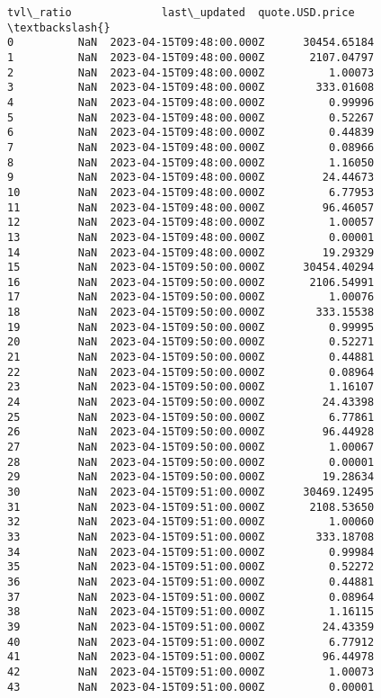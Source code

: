 \documentclass[11pt]{article}
\begin{document}
\begin{tcolorbox}[breakable, size=fbox, boxrule=.5pt, pad at break*=1mm, opacityfill=0]
\begin{Verbatim}[commandchars=\\\{\}]
     tvl\_ratio              last\_updated  quote.USD.price  \textbackslash{}
0          NaN  2023-04-15T09:48:00.000Z      30454.65184
1          NaN  2023-04-15T09:48:00.000Z       2107.04797
2          NaN  2023-04-15T09:48:00.000Z          1.00073
3          NaN  2023-04-15T09:48:00.000Z        333.01608
4          NaN  2023-04-15T09:48:00.000Z          0.99996
5          NaN  2023-04-15T09:48:00.000Z          0.52267
6          NaN  2023-04-15T09:48:00.000Z          0.44839
7          NaN  2023-04-15T09:48:00.000Z          0.08966
8          NaN  2023-04-15T09:48:00.000Z          1.16050
9          NaN  2023-04-15T09:48:00.000Z         24.44673
10         NaN  2023-04-15T09:48:00.000Z          6.77953
11         NaN  2023-04-15T09:48:00.000Z         96.46057
12         NaN  2023-04-15T09:48:00.000Z          1.00057
13         NaN  2023-04-15T09:48:00.000Z          0.00001
14         NaN  2023-04-15T09:48:00.000Z         19.29329
15         NaN  2023-04-15T09:50:00.000Z      30454.40294
16         NaN  2023-04-15T09:50:00.000Z       2106.54991
17         NaN  2023-04-15T09:50:00.000Z          1.00076
18         NaN  2023-04-15T09:50:00.000Z        333.15538
19         NaN  2023-04-15T09:50:00.000Z          0.99995
20         NaN  2023-04-15T09:50:00.000Z          0.52271
21         NaN  2023-04-15T09:50:00.000Z          0.44881
22         NaN  2023-04-15T09:50:00.000Z          0.08964
23         NaN  2023-04-15T09:50:00.000Z          1.16107
24         NaN  2023-04-15T09:50:00.000Z         24.43398
25         NaN  2023-04-15T09:50:00.000Z          6.77861
26         NaN  2023-04-15T09:50:00.000Z         96.44928
27         NaN  2023-04-15T09:50:00.000Z          1.00067
28         NaN  2023-04-15T09:50:00.000Z          0.00001
29         NaN  2023-04-15T09:50:00.000Z         19.28634
30         NaN  2023-04-15T09:51:00.000Z      30469.12495
31         NaN  2023-04-15T09:51:00.000Z       2108.53650
32         NaN  2023-04-15T09:51:00.000Z          1.00060
33         NaN  2023-04-15T09:51:00.000Z        333.18708
34         NaN  2023-04-15T09:51:00.000Z          0.99984
35         NaN  2023-04-15T09:51:00.000Z          0.52272
36         NaN  2023-04-15T09:51:00.000Z          0.44881
37         NaN  2023-04-15T09:51:00.000Z          0.08964
38         NaN  2023-04-15T09:51:00.000Z          1.16115
39         NaN  2023-04-15T09:51:00.000Z         24.43359
40         NaN  2023-04-15T09:51:00.000Z          6.77912
41         NaN  2023-04-15T09:51:00.000Z         96.44978
42         NaN  2023-04-15T09:51:00.000Z          1.00073
43         NaN  2023-04-15T09:51:00.000Z          0.00001

\end{Verbatim}
\end{tcolorbox}
\end{document}
